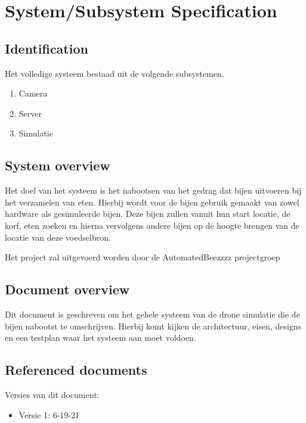 \section{System/Subsystem Specification}


\subsection{Identification}
Het volledige systeem bestaad uit de volgende subsystemen.
\begin{enumerate}
    \item Camera
    \item Server
    \item Simulatie
\end{enumerate}

\subsection{System overview}
Het doel van het systeem is het nabootsen van het gedrag dat bijen uitvoeren bij het verzamelen van eten.
Hierbij wordt voor de bijen gebruik gemaakt van zowel hardware als gesimuleerde bijen.
Deze bijen zullen vanuit hun start locatie, de korf, eten zoeken
en hierna vervolgens andere bijen op de hoogte brengen van de locatie van deze voedselbron.

Het project zal uitgevoerd worden door de AutomatedBeezzzz projectgroep

\subsection{Document overview}
Dit document is geschreven om het gehele systeem van de drone simulatie die de bijen nabootst te omschrijven. Hierbij komt kijken de architectuur, eisen, designs en een testplan waar het systeem aan moet voldoen.

\subsection{Referenced documents}
Versies van dit document:
\begin{itemize}
    \item Versie 1: 6-19-21
\end{itemize}

